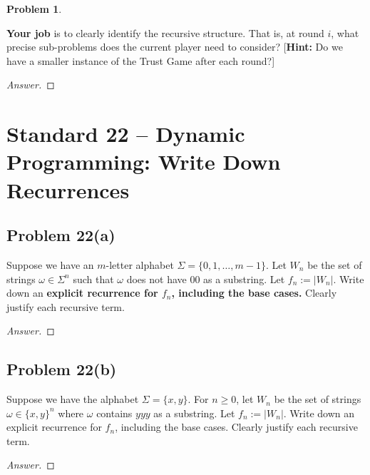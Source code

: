 \documentclass[11pt]{article}
\theoremstyle{definition}
\theoremstyle{definition}
\newtheorem{required}{Problem}
\theoremstyle{definition}
\begin{document}
\begin{required}
\begin{enumerate}
\noindent \textbf{Your job} is to clearly identify the recursive structure. That is, at round $i$, what precise sub-problems does the current player need to consider? [\textbf{Hint:} Do we have a smaller instance of the Trust Game after each round?]

\begin{proof}[Answer]
\end{proof}
\end{enumerate}
\end{required}

\newpage
\section{Standard 22 -- Dynamic Programming: Write Down Recurrences}

\subsection*{Problem 22(a)}

Suppose we have an $m$-letter alphabet $\Sigma = \{0, 1, \ldots, m-1\}$. Let $W_{n}$ be the set of strings $\omega \in \Sigma^{n}$ such that $\omega$ does not have $00$ as a substring. Let $f_{n} := |W_{n}|$. Write down an \textbf{explicit recurrence for $f_{n}$, including the base cases.} Clearly justify each recursive term.
    
\begin{proof}[Answer]
\end{proof}

\newpage
\subsection*{Problem 22(b)}

Suppose we have the alphabet $\Sigma = \{x, y\}$. For $n \geq 0$, let $W_{n}$ be the set of strings $\omega \in \{x, y\}^{n}$ where $\omega$ contains $yyy$ as a substring. Let $f_{n} := |W_{n}|$. Write down an explicit recurrence for $f_{n}$, including the base cases. Clearly justify each recursive term.

\begin{proof}[Answer]
\end{proof}
\end{document}
